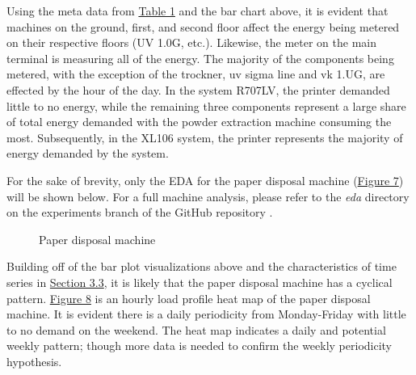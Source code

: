 Using the meta data from \hyperlink{table.1}{Table 1} and the bar chart above, it is evident that machines on the ground, first, and second floor affect the energy being metered on their respective floors (UV 1.0G, etc.). Likewise, the meter on the main terminal is measuring all of the energy. The majority of the components being metered, with the exception of the trockner, uv sigma line and vk 1.UG, are effected by the hour of the day. In the system R707LV, the printer demanded little to no energy, while the remaining three components represent a large share of total energy demanded with the powder extraction machine consuming the most. Subsequently, in the XL106 system, the printer represents the majority of energy demanded by the system. 

For the sake of brevity, only the EDA for the paper disposal machine (\hyperlink{figure.7}{Figure 7}) will be shown below. For a full machine analysis, please refer to the \textit{eda} directory on the experiments branch of the GitHub repository \cite{Stechschulte_Gaussian_Processes_for_2022}. 

\begin{figure}[h]
  \centering
  \graphicspath{ {./images/} }
  \hfill
  \caption{Paper disposal machine}
\end{figure}

Building off of the bar plot visualizations above and the characteristics of time series in \hyperlink{subsection3.3}{Section 3.3}, it is likely that the paper disposal machine has a cyclical pattern. \hyperlink{figure.8}{Figure 8} is an hourly load profile heat map of the paper disposal machine. It is evident there is a daily periodicity from Monday-Friday with little to no demand on the weekend. The heat map indicates a daily and potential weekly pattern; though more data is needed to confirm the weekly periodicity hypothesis. 

